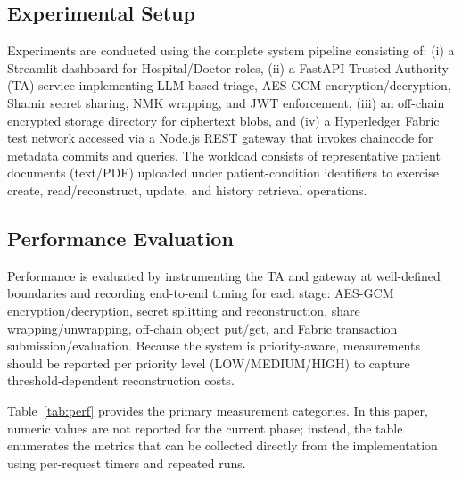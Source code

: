 \documentclass{IEEEtran}
\begin{document}
\subsection{Experimental Setup}
Experiments are conducted using the complete system pipeline consisting of: (i) a Streamlit dashboard for Hospital/Doctor roles, (ii) a FastAPI Trusted Authority (TA) service implementing LLM-based triage, AES-GCM encryption/decryption, Shamir secret sharing, NMK wrapping, and JWT enforcement, (iii) an off-chain encrypted storage directory for ciphertext blobs, and (iv) a Hyperledger Fabric test network accessed via a Node.js REST gateway that invokes chaincode for metadata commits and queries. The workload consists of representative patient documents (text/PDF) uploaded under patient-condition identifiers to exercise create, read/reconstruct, update, and history retrieval operations.

\subsection{Performance Evaluation}
Performance is evaluated by instrumenting the TA and gateway at well-defined boundaries and recording end-to-end timing for each stage: AES-GCM encryption/decryption, secret splitting and reconstruction, share wrapping/unwrapping, off-chain object put/get, and Fabric transaction submission/evaluation. Because the system is priority-aware, measurements should be reported per priority level (LOW/MEDIUM/HIGH) to capture threshold-dependent reconstruction costs.

Table~\ref{tab:perf} provides the primary measurement categories. In this paper, numeric values are not reported for the current phase; instead, the table enumerates the metrics that can be collected directly from the implementation using per-request timers and repeated runs.

\begin{table}[!t]
\caption{Performance Metrics Comparison (Planned)}
\label{tab:perf}
\centering
\footnotesize
\setlength{\tabcolsep}{3pt}
\end{table}
\end{document}

